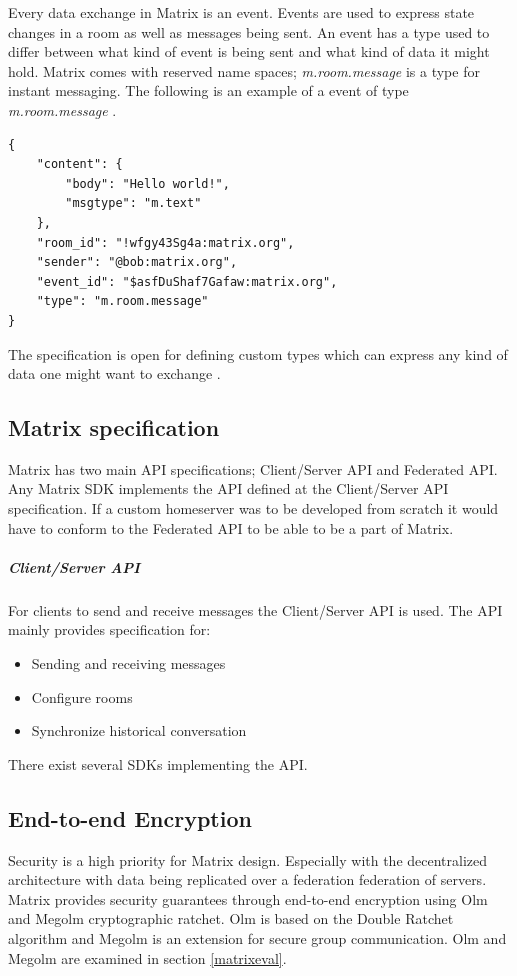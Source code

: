 Every data exchange in Matrix is an event. Events are used to express state changes in a room as well as messages being sent. An event has a type used to differ between what kind of event is being sent and what kind of data it might hold. Matrix comes with reserved name spaces; \emph{m.room.message} is a type for instant messaging. The following is an example of a event of type \emph{m.room.message} \cite{matrixspec}.


\begin{lstlisting}[style=json]
{
	"content": {
		"body": "Hello world!",
		"msgtype": "m.text"
	},
	"room_id": "!wfgy43Sg4a:matrix.org",
	"sender": "@bob:matrix.org",
	"event_id": "$asfDuShaf7Gafaw:matrix.org",
	"type": "m.room.message"
}
\end{lstlisting}

The specification is open for defining custom types which can express any kind of data one might want to exchange \cite{typeofevent}.


\subsection{Matrix specification}
Matrix has two main API specifications; Client/Server API and Federated API. Any Matrix SDK implements the API defined at the Client/Server API specification. If a custom homeserver was to be developed from scratch it would have to conform to the Federated API to be able to be a part of Matrix. 

\subparagraph{Client/Server API}
For clients to send and receive messages the Client/Server API is used. The API mainly provides specification for:

\begin{itemize}
	\item Sending and receiving messages
	\item Configure rooms
	\item Synchronize historical conversation
\end{itemize}

There exist several SDKs implementing the API.  

\subsection{End-to-end Encryption}
Security is a high priority for Matrix design. Especially with the decentralized architecture with data being replicated over a federation federation of servers. Matrix provides security guarantees through end-to-end encryption using Olm and Megolm cryptographic ratchet. Olm is based on the Double Ratchet algorithm and Megolm is an extension for secure group communication. Olm and Megolm are examined in section \ref{matrixeval}.



